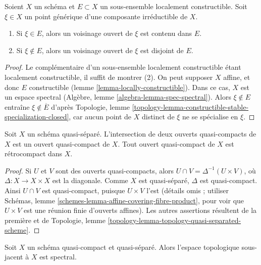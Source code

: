 \begin{lemma}
\label{lemma-generic-point-in-constructible}
Soient $X$ un schéma et $E \subset X$ un sous-ensemble localement constructible.
Soit $\xi \in X$ un point générique d'une composante irréductible de $X$.
\begin{enumerate}
\item Si $\xi \in E$, alors un voisinage ouvert de
$\xi$ est contenu dans $E$.
\item Si $\xi \not \in E$, alors un voisinage ouvert
de $\xi$ est disjoint de $E$.
\end{enumerate}
\end{lemma}

\begin{proof}
Le complémentaire d'un sous-ensemble localement constructible étant localement
constructible, il suffit de montrer (2). On peut supposer $X$
affine, et donc $E$ constructible (lemme \ref{lemma-locally-constructible}).
Dans ce cas, $X$ est un espace spectral
(Algèbre, lemme \ref{algebra-lemma-spec-spectral}).
Alors $\xi \not \in E$ entraîne $\xi \not \in \overline{E}$ d'après
Topologie, lemme \ref{topology-lemma-constructible-stable-specialization-closed},
car aucun point de $X$ distinct de $\xi$
ne se spécialise en $\xi$.
\end{proof}

\begin{lemma}
\label{lemma-quasi-separated-quasi-compact-open-retrocompact}
Soit $X$ un schéma quasi-séparé. L'intersection de deux
ouverts quasi-compacts de $X$ est un ouvert quasi-compact de $X$.
Tout ouvert quasi-compact de $X$ est rétrocompact dans $X$.
\end{lemma}

\begin{proof}
Si $U$ et $V$ sont des ouverts quasi-compacts, alors
$U \cap V = \Delta^{-1}(U \times V)$, où $\Delta : X \to X \times X$
est la diagonale. Comme $X$ est quasi-séparé, $\Delta$ est
quasi-compact. Ainsi $U \cap V$ est quasi-compact, puisque
$U \times V$ l'est (détails omis ; utiliser
Schémas, lemme \ref{schemes-lemma-affine-covering-fibre-product},
pour voir que $U \times V$ est une réunion finie d'ouverts affines).
Les autres assertions résultent de la première et de
Topologie, lemme \ref{topology-lemma-topology-quasi-separated-scheme}.
\end{proof}

\begin{lemma}
\label{lemma-quasi-compact-quasi-separated-spectral}
Soit $X$ un schéma quasi-compact et quasi-séparé.
Alors l'espace topologique sous-jacent à $X$ est spectral.
\end{lemma}

